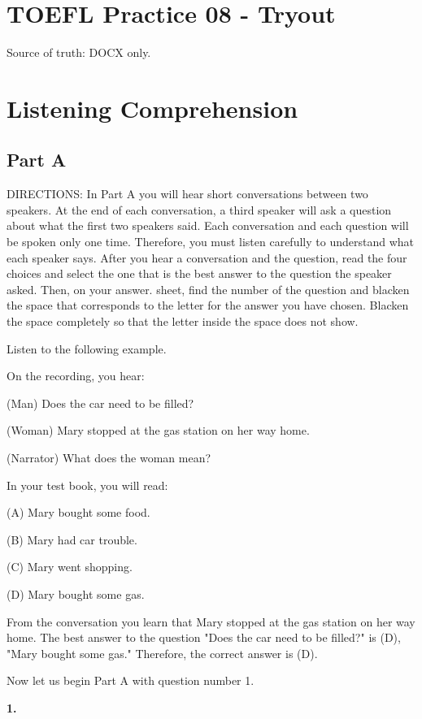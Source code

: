 \documentclass[12pt]{article}
\begin{document}
\section*{TOEFL Practice 08 - Tryout}
Source of truth: DOCX only.
\section*{Listening Comprehension}
\subsection*{Part A}
DIRECTIONS: In Part A you will hear short conversations between two speakers. At the end of each conversation, a third speaker will ask a question about what the first two speakers said. Each conversation and each question will be spoken only one time. Therefore, you must listen carefully to understand what each speaker says. After you hear a conversation and the question, read the four choices and select the one that is the best answer to the question the speaker asked. Then, on your answer. sheet, find the number of the question and blacken the space that corresponds to the letter for the answer you have chosen. Blacken the space completely so that the letter inside the space does not show.\par
\begin{exampleblock}
Listen to the following example.\par
On the recording, you hear:\par
(Man) Does the car need to be filled?\par
(Woman) Mary stopped at the gas station on her way home.\par
(Narrator) What does the woman mean?\par
In your test book, you will read:\par
(A) Mary bought some food.\par
(B) Mary had car trouble.\par
(C) Mary went shopping.\par
(D) Mary bought some gas.\par
From the conversation you learn that Mary stopped at the gas station on her way home. The best answer to the question "Does the car need to be filled?" is (D), "Mary bought some gas." Therefore, the correct answer is (D).\par
Now let us begin Part A with question number 1.\par
\end{exampleblock}
\noindent\textbf{1.}
\end{document}
